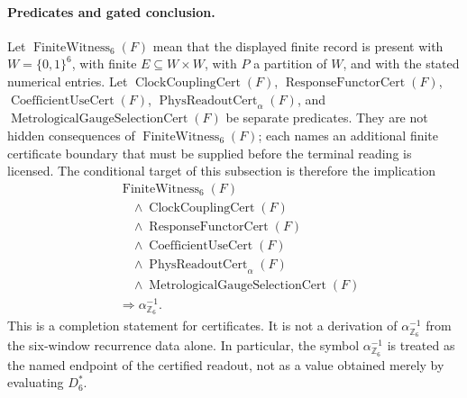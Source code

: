 \paragraph{Predicates and gated conclusion.}
Let $\operatorname{FiniteWitness}_{6}(F)$ mean that the displayed finite record is present with $W=\{0,1\}^6$, with finite $E\subseteq W\times W$, with $P$ a partition of $W$, and with the stated numerical entries.  Let $\operatorname{ClockCouplingCert}(F)$, $\operatorname{ResponseFunctorCert}(F)$, $\operatorname{CoefficientUseCert}(F)$, $\operatorname{PhysReadoutCert}_{\alpha}(F)$, and $\operatorname{MetrologicalGaugeSelectionCert}(F)$ be separate predicates.  They are not hidden consequences of $\operatorname{FiniteWitness}_{6}(F)$; each names an additional finite certificate boundary that must be supplied before the terminal reading is licensed.  The conditional target of this subsection is therefore the implication
$$
\begin{aligned}
&\operatorname{FiniteWitness}_{6}(F)\\
&\quad{}\wedge\operatorname{ClockCouplingCert}(F)\\
&\quad{}\wedge\operatorname{ResponseFunctorCert}(F)\\
&\quad{}\wedge\operatorname{CoefficientUseCert}(F)\\
&\quad{}\wedge\operatorname{PhysReadoutCert}_{\alpha}(F)\\
&\quad{}\wedge\operatorname{MetrologicalGaugeSelectionCert}(F)\\
&\Longrightarrow \alpha_{\mathbb Z_6}^{-1}.
\end{aligned}
$$
This is a completion statement for certificates.  It is not a derivation of $\alpha_{\mathbb Z_6}^{-1}$ from the six-window recurrence data alone.  In particular, the symbol $\alpha_{\mathbb Z_6}^{-1}$ is treated as the named endpoint of the certified readout, not as a value obtained merely by evaluating $D_6^\ast$.


